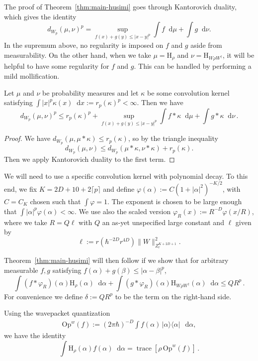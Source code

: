 \documentclass[11pt]{amsart}
\def\Husimi{{\mathrm{H}}}
\def\Op{\mathrm{Op}}
\def\trace{\operatorname*{trace}}
\newcommand{\diff}{\mathop{}\!\mathrm{d}}
\numberwithin{equation}{section}
\begin{document}
The proof of Theorem~\ref{thm:main-husimi} goes through Kantorovich duality, which gives
the identity
\[
d_{W_p}(\mu,\nu)^p = \sup_{f(x)+g(y)\leq |x-y|^p} \int f\diff \mu + \int g\diff \nu.
\]
In the supremum above, no regularity is imposed on $f$ and $g$ aside from measurability.
On the other hand, when we take $\mu = \Husimi_\rho$ and $\nu=\Husimi_{W\rho W^\dagger}$, it will
be helpful to have some regularity for $f$ and $g$.   This can be handled by performing a
mild mollification.
\begin{lemma}
Let $\mu$ and $\nu$ be probability measures and let $\kappa$ be some convolution kernel satisfying
$\int |x|^p\kappa(x)\diff x := r_p(\kappa)^p < \infty$.  Then we have
\[
d_{W_p}(\mu,\nu)^p \leq r_p(\kappa)^p +
\sup_{f(x)+g(y)\leq |x-y|^p} \int f\ast \kappa \diff \mu + \int g\ast \kappa \diff \nu\,.
\]
\end{lemma}
\begin{proof}
We have $d_{W_p}(\mu,\mu\ast\kappa) \leq r_p(\kappa)$, so by the triangle inequality
\[
d_{W_p}(\mu,\nu) \leq d_{W_p}(\mu\ast \kappa, \nu\ast \kappa) + r_p(\kappa).
\]
Then we apply Kantorovich duality to the first term.
\end{proof}

We will need to use a specific convolution kernel with polynomial decay.
To this end, we fix $K = 2D+10+2\lceil p\rceil$ and define
$\varphi(\alpha) := C(1+|\alpha|^2)^{-K/2}$, with $C=C_K$ chosen such that $\int \varphi = 1$.  The exponent is chosen to be large enough that $\int |\alpha|^p \varphi(\alpha) < \infty$.
We use also the scaled version $\varphi_R(x) := R^{-D} \varphi(x/R)$, where we take
$R=Q\ell$ with $Q$ an as-yet unspecified large constant and $\ell$ given by
\begin{equation}
\label{eq:ell-def}
\ell := r (\hbar^{-2D}r^{4D}) \|W\|_{Z^{K+2D+1}_r}^2.
\end{equation}

Theorem~\ref{thm:main-husimi} will then follow if we show that for arbitrary measurable
$f,g$ satisfying $f(\alpha)+g(\beta) \leq |\alpha-\beta|^p$,
\begin{equation}
\label{eq:husimi-KR}
\int (f\ast \varphi_{R})(\alpha) \Husimi_\rho(\alpha)\diff\alpha
+ \int (g\ast\varphi_{R})(\alpha) \Husimi_{W\rho W^\dagger}(\alpha)\diff\alpha
\leq Q R^p\,.
\end{equation}
For convenience we define $\delta := QR^p$ to be the term on the right-hand side.

Using the wavepacket quantization
\begin{align}
\label{E:Opwdef1}
\Op^w(f) := (2\pi\hbar)^{-D} \int f(\alpha) \,|\alpha\rangle \langle \alpha|\,\diff\alpha,
\end{align}
we have the identity
\[
\int \Husimi_\rho(\alpha) f(\alpha)\diff\alpha = \trace[\rho \,\Op^w(f)]\,.
\]
\end{document}
